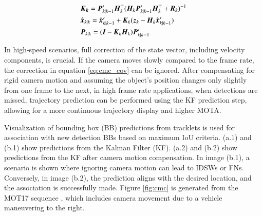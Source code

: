 \begin{equation}
  \begin{aligned}
  & \vb*{K_k} =  {{\vb*{P}}}^{\prime}_{k|k-1} \vb*{H}_k^\top (\vb*{H}_k  {{\vb*{P}}}^{\prime}_{k|k-1} \vb*{H}_k^\top + \vb*{R}_k)^{-1} \\
  & \hat{\vb*{x}}_{k|k} = \hat{\vb*{x}}^\prime_{k|k-1} + \vb*{K}_k (\vb*{z}_k - \vb*{H}_k \hat{\vb*{x}}^\prime_{k|k-1}) \\
  & \vb*{P}_{k|k} = (\vb*{I}- \vb*{K}_k \vb*{H}_k)  {{\vb*{P}}}^{\prime}_{k|k-1}
  \end{aligned}
  \label{eq:cmc_update_kf}
\end{equation} 

In high-speed scenarios, full correction of the state vector, including velocity components, is crucial. If the camera moves slowly compared to the frame rate, the correction in equation \ref{eq:cmc_cov} can be ignored. After compensating for rigid camera motion and assuming the object's position changes only slightly from one frame to the next, in high frame rate applications, when detections are missed, trajectory prediction can be performed using the KF prediction step, allowing for a more continuous trajectory display and higher MOTA.

Visualization of bounding box (BB) predictions from tracklets is used for association with new detection BBs based on maximum IoU criteria. (a.1) and (b.1) show predictions from the Kalman Filter (KF). (a.2) and (b.2) show predictions from the KF after camera motion compensation. In image (b.1), a scenario is shown where ignoring camera motion can lead to IDSWs or FNs. Conversely, in image (b.2), the prediction aligns with the desired location, and the association is successfully made. Figure \ref{fig:cmc} is generated from the MOT17 sequence \cite{milan2016mot16}, which includes camera movement due to a vehicle maneuvering to the right.

